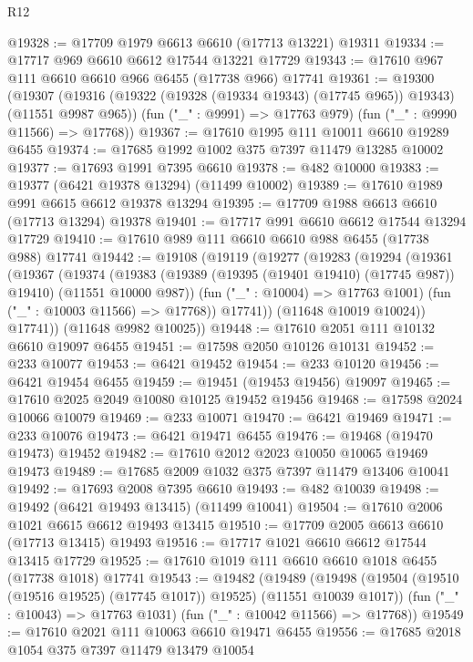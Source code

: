 \begin{lexlean}{R12}
\begin{coremodule}
{{{{{{{{{{{{{{{{{{{{{{{{{{{{{{{{{{{{{{{{{{{{{{{{{{{{{{{{{{{{{{{{{{{{{{{{{{{{{{{{{{@19328 := @17709 @1979 @6613 @6610 (@17713 @13221) @19311
@19334 := @17717 @969 @6610 @6612 @17544 @13221 @17729
@19343 := @17610 @967 @111 @6610 @6610 @966 @6455 (@17738 @966) @17741
@19361 := @19300
    (@19307
      (@19316 (@19322 (@19328 (@19334 @19343) (@17745 @965)) @19343) (@11551 @9987 @965))
      (fun ("_" : @9991) => @17763 @979)
      (fun ("_" : @9990 @11566) => @17768))
@19367 := @17610 @1995 @111 @10011 @6610 @19289 @6455
@19374 := @17685 @1992 @1002 @375 @7397 @11479 @13285 @10002
@19377 := @17693 @1991 @7395 @6610
@19378 := @482 @10000
@19383 := @19377 (@6421 @19378 @13294) (@11499 @10002)
@19389 := @17610 @1989 @991 @6615 @6612 @19378 @13294
@19395 := @17709 @1988 @6613 @6610 (@17713 @13294) @19378
@19401 := @17717 @991 @6610 @6612 @17544 @13294 @17729
@19410 := @17610 @989 @111 @6610 @6610 @988 @6455 (@17738 @988) @17741
@19442 := @19108
    (@19119
      (@19277
        (@19283
          (@19294
            (@19361
              (@19367
                (@19374
                  (@19383
                    (@19389 (@19395 (@19401 @19410) (@17745 @987)) @19410)
                    (@11551 @10000 @987))
                  (fun ("_" : @10004) => @17763 @1001)
                  (fun ("_" : @10003 @11566) => @17768))
                @17741))
            (@11648 @10019 @10024))
          @17741))
      (@11648 @9982 @10025))
@19448 := @17610 @2051 @111 @10132 @6610 @19097 @6455
@19451 := @17598 @2050 @10126 @10131
@19452 := @233 @10077
@19453 := @6421 @19452
@19454 := @233 @10120
@19456 := @6421 @19454 @6455
@19459 := @19451 (@19453 @19456) @19097
@19465 := @17610 @2025 @2049 @10080 @10125 @19452 @19456
@19468 := @17598 @2024 @10066 @10079
@19469 := @233 @10071
@19470 := @6421 @19469
@19471 := @233 @10076
@19473 := @6421 @19471 @6455
@19476 := @19468 (@19470 @19473) @19452
@19482 := @17610 @2012 @2023 @10050 @10065 @19469 @19473
@19489 := @17685 @2009 @1032 @375 @7397 @11479 @13406 @10041
@19492 := @17693 @2008 @7395 @6610
@19493 := @482 @10039
@19498 := @19492 (@6421 @19493 @13415) (@11499 @10041)
@19504 := @17610 @2006 @1021 @6615 @6612 @19493 @13415
@19510 := @17709 @2005 @6613 @6610 (@17713 @13415) @19493
@19516 := @17717 @1021 @6610 @6612 @17544 @13415 @17729
@19525 := @17610 @1019 @111 @6610 @6610 @1018 @6455 (@17738 @1018) @17741
@19543 := @19482
    (@19489
      (@19498 (@19504 (@19510 (@19516 @19525) (@17745 @1017)) @19525) (@11551 @10039 @1017))
      (fun ("_" : @10043) => @17763 @1031)
      (fun ("_" : @10042 @11566) => @17768))
@19549 := @17610 @2021 @111 @10063 @6610 @19471 @6455
@19556 := @17685 @2018 @1054 @375 @7397 @11479 @13479 @10054
}}}}}}}}}}}}}}}}}}}}}}}}}}}}}}}}}}}}}}}}}}}}}}}}}}}}}}}}}}}}}}}}}}}}}}}}}}}}}}}}}}
\end{coremodule}
\end{lexlean}
